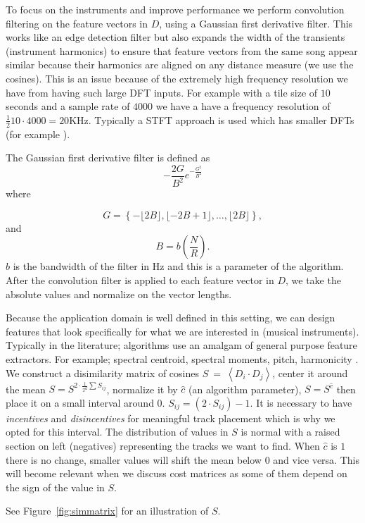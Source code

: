\documentclass[twocolumn]{article}
\begin{document}
	To focus on the instruments and improve performance we perform convolution filtering on the feature vectors in $D$, using a Gaussian first derivative filter. This works like an edge detection filter but also expands the width of the transients (instrument harmonics) to ensure that feature vectors from the same song appear similar because their harmonics are aligned on any distance measure (we use the cosines). This is an issue because of the extremely high frequency resolution we have from having such large DFT inputs. For example with a tile size of $10$ seconds and a sample rate of $4000$ we have a have a frequency resolution of $\frac{1}{2}10 \cdot 4000 = 20$KHz. Typically a STFT approach is used which has smaller DFTs (for example \cite{tzanetakis1999multifeature}). 
	
	The Gaussian first derivative filter is defined as 
	$$- \frac{2 G}{B^2}  e^{-\frac{G^2}{B^2}} $$ where 
	
	$$G=\left\{-\lfloor 2B\rfloor,\lfloor-2B+1\rfloor,\ldots, \lfloor 2 B \rfloor\right\},$$ and $$B = b \left( \frac{N}{R} \right).$$ $b$ is the bandwidth of the filter in Hz and this is a parameter of the algorithm. After the convolution filter is applied to each feature vector in $D$, we take the absolute values and normalize on the vector lengths.  
	
	Because the application domain is well defined in this setting, we can design features that look specifically for what we are interested in (musical instruments). Typically in the literature; algorithms use an amalgam of general purpose feature extractors. For example; spectral centroid, spectral moments, pitch, harmonicity \cite{tzanetakis1999framework}. We construct a disimilarity matrix of cosines $S ~=~ \left< D_{i} \cdot D_{j} \right>$, center it around the mean $S = S^{2 \cdot \frac{1}{T^2}\sum S_{ij}}$, normalize it by $\hat c$ (an algorithm parameter), $S=S^{\hat c}$ then place it on a small interval around $0$. $S_{ij} = \left( 2 \cdot S_{ij} \right)-1$. It is necessary to have \textit{incentives} and \textit{disincentives} for meaningful track placement which is why we opted for this interval. The distribution of values in $S$ is normal with a raised section on left (negatives) representing the tracks we want to find. When $\hat c$ is $1$ there is no change, smaller values will shift the mean below $0$ and vice versa. This will become relevant when we discuss cost matrices as some of them depend on the sign of the value in $S$. 
	
	See Figure~\ref{fig:simmatrix} for an illustration of $S$.
	
\end{document}
